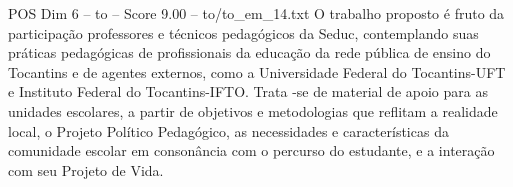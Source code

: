 \begin{textsample}{POS Dim 6 – to – Score 9.00 – to/to\_em\_14.txt}
O trabalho proposto é fruto da participação professores e técnicos pedagógicos da Seduc, contemplando suas práticas pedagógicas de profissionais da educação da rede pública de ensino do Tocantins e de agentes externos, como a Universidade Federal do Tocantins-UFT e Instituto Federal do Tocantins-IFTO.
Trata -se de material de apoio para as unidades escolares, a partir de objetivos e metodologias que reflitam a realidade local, o Projeto Político Pedagógico, as necessidades e características da comunidade escolar em consonância com o percurso do estudante, e a interação com seu Projeto de Vida.

\end{textsample}
